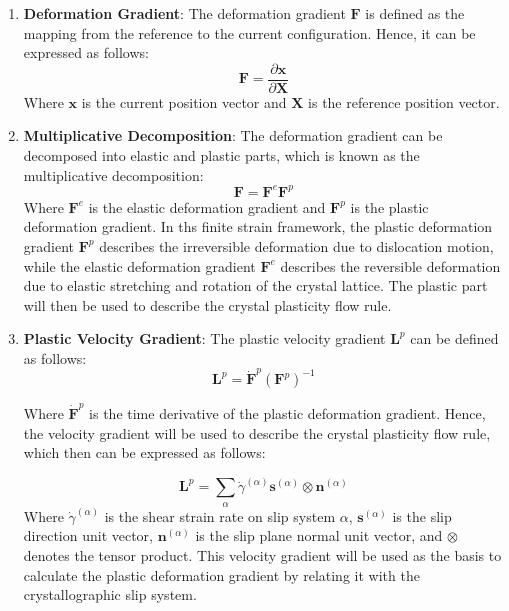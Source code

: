 \documentclass[12pt]{article}
\begin{document}
\begin{enumerate}
    \item \textbf{Deformation Gradient}: The deformation gradient $\boldsymbol{F}$ is defined as the mapping
    from the reference to the current configuration. Hence, it can be expressed as follows:
    \begin{equation}
        \boldsymbol{F} = \frac{\partial \boldsymbol{x}}{\partial \boldsymbol{X}}
    \end{equation}
    Where $\boldsymbol{x}$ is the current position vector and $\boldsymbol{X}$ is the reference position vector.
    \item \textbf{Multiplicative Decomposition}: The deformation gradient can be decomposed into elastic and 
    plastic parts, which is known as the multiplicative decomposition:
    \begin{equation}
        \boldsymbol{F} = \boldsymbol{F}^{e} \boldsymbol{F}^{p}
    \end{equation}
    Where $\boldsymbol{F}^{e}$ is the elastic deformation gradient and $\boldsymbol{F}^{p}$ is the plastic 
    deformation gradient. In ths finite strain framework, the plastic deformation gradient
    $\boldsymbol{F}^{p}$ describes the irreversible deformation due to dislocation motion, while the elastic
    deformation gradient $\boldsymbol{F}^{e}$ describes the reversible deformation due to elastic stretching
    and rotation of the crystal lattice. The plastic part will then be used to describe the crystal plasticity
    flow rule. 

    \item \textbf{Plastic Velocity Gradient}: The plastic velocity gradient $\boldsymbol{L}^{p}$ can be 
    defined as follows:
    \begin{equation}
        \boldsymbol{L}^{p} = \dot{\boldsymbol{F}}^{p} (\boldsymbol{F}^{p})^{-1}
    \end{equation}

    Where $\dot{\boldsymbol{F}}^{p}$ is the time derivative of the plastic deformation gradient. Hence, the velocity
    gradient will be used to describe the crystal plasticity flow rule, which then can be expressed as follows:
    
    \begin{equation}
        \boldsymbol{L}^{p} = \sum_{\alpha} \dot{\gamma}^{(\alpha)} \boldsymbol{s}^{(\alpha)} \otimes \boldsymbol{n}^{(\alpha)} 
\end{equation}
    Where $\dot{\gamma}^{(\alpha)}$ is the shear strain rate on slip system $\alpha$, $\boldsymbol{s}^{(\alpha)}$ is the slip direction unit vector,
    $\boldsymbol{n}^{(\alpha)}$ is the slip plane normal unit vector, and $\otimes$ denotes the tensor product. This velocity gradient 
    will be used as the basis to calculate the plastic deformation gradient by relating it with the crystallographic slip system. 
\end{enumerate}
\end{document}
